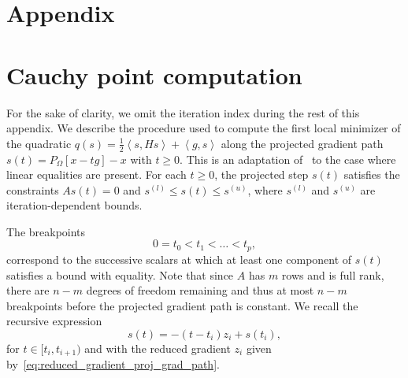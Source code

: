 \documentclass{article}
\numberwithin{equation}{section}
\newcommand{\inner}[2]{\left\langle {#1} , {#2} \right\rangle} %
\newcommand{\proj}[2]{P_{#1} \left[ {#2} \right]} %
\theoremstyle{plain}
\begin{document}
	
	
	
	\clearpage
	
	\section*{Appendix}
	
	\appendix
	
	
	\section{Cauchy point computation}\label{appendix:cauchy_point_computation}
	
	For the sake of clarity, we omit the iteration index during the rest of this appendix. 
	We describe the procedure used to compute the first local minimizer of the quadratic $q(s) = \frac{1}{2} \inner{s}{Hs} + \inner{g}{s}$ along the projected gradient path $s(t) = \proj{\Omega}{x-tg}-x$ with $t \ge 0$. This is an adaptation of~\cite[Algorithm 17.3.1]{conn-etal:2000} to the case where linear equalities are present. 
	For each $t \ge 0$, the projected step $s(t)$ satisfies the constraints
	$As(t) = 0$ and $s^{(l)} \le s(t) \le s^{(u)}$,
	where $s^{(l)}$ and $s^{(u)}$ are iteration-dependent bounds.
	
	The breakpoints
	\begin{equation*}
		0=t_0 < t_1 < \ldots < t_p,
	\end{equation*} 
	correspond to the successive scalars at which at least one component of $s(t)$ satisfies a bound with equality. Note that since $A$ has $m$ rows and is full rank, there are $n-m$ degrees of freedom remaining  and thus at most $n-m$ breakpoints before the projected gradient path is constant. We recall the recursive expression
	\[s(t) = -(t-t_i)z_i + s(t_i),\]
	for $t\in [t_i,t_{i+1})$ and with the reduced gradient $z_i$ given by~\eqref{eq:reduced_gradient_proj_grad_path}.
	
\end{document}
